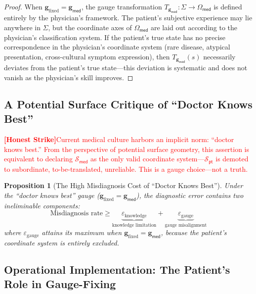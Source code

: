 \documentclass[12pt,a4paper]{article}
\newtheorem{proposition}[theorem]{Proposition}
\theoremstyle{remark}
\newcommand{\med}{\textsf{med}}
\newcommand{\pt}{\textsf{pt}}
\newcommand{\honestcrit}[1]{%
    \textcolor{red}{\textbf{[Honest Strike]}#1}%
}
\begin{document}
\begin{proof}
When $\mathbf{g}_{\text{fixed}} = \mathbf{g}_{\med}$, the gauge transformation $T_{\mathbf{g}_{\med}}: \Sigma \to \Omega_{\med}$ is defined entirely by the physician's framework. The patient's subjective experience may lie anywhere in $\Sigma$, but the coordinate axes of $\Omega_{\med}$ are laid out according to the physician's classification system. If the patient's true state has no precise correspondence in the physician's coordinate system (rare disease, atypical presentation, cross-cultural symptom expression), then $T_{\mathbf{g}_{\med}}(s)$ necessarily deviates from the patient's true state---this deviation is systematic and does not vanish as the physician's skill improves.
\end{proof}

\subsection{A Potential Surface Critique of ``Doctor Knows Best''}

\honestcrit{Current medical culture harbors an implicit norm: ``doctor knows best.'' From the perspective of potential surface geometry, this assertion is equivalent to declaring $\mathcal{S}_{\med}$ as the only valid coordinate system---$\mathcal{S}_{\pt}$ is demoted to subordinate, to-be-translated, unreliable. This is a gauge choice---not a truth.}

\begin{proposition}[The High Misdiagnosis Cost of ``Doctor Knows Best'']\label{prop:doctor_knows_best}
Under the ``doctor knows best'' gauge ($\mathbf{g}_{\text{fixed}} = \mathbf{g}_{\med}$), the diagnostic error contains two ineliminable components:
\begin{equation}
    \text{Misdiagnosis rate} \geq \underbrace{\varepsilon_{\text{knowledge}}}_{\text{knowledge limitation}} + \underbrace{\varepsilon_{\text{gauge}}}_{\text{gauge misalignment}}
\end{equation}
where $\varepsilon_{\text{gauge}}$ attains its maximum when $\mathbf{g}_{\text{fixed}} = \mathbf{g}_{\med}$, because the patient's coordinate system is entirely excluded.
\end{proposition}

\subsection{Operational Implementation: The Patient's Role in Gauge-Fixing}
\end{document}

